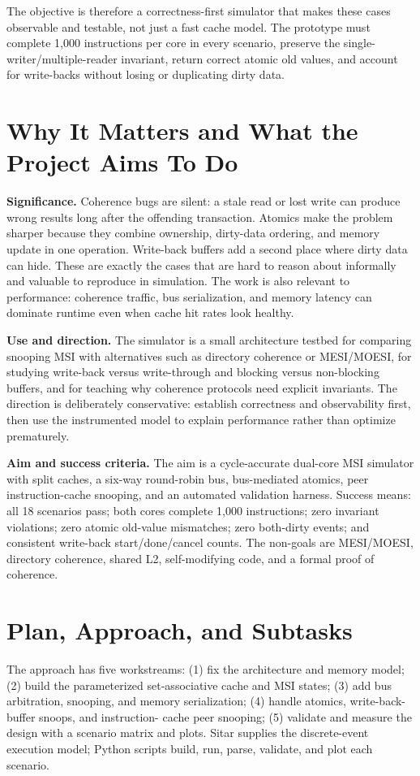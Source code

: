 \documentclass[11pt,a4paper]{article}
\begin{document}
The objective is therefore a correctness-first simulator that makes these cases
observable and testable, not just a fast cache model. The prototype must complete
1,000 instructions per core in every scenario, preserve the single-writer/multiple-reader
invariant, return correct atomic old values, and account for write-backs without losing
or duplicating dirty data.

\section{Why It Matters and What the Project Aims To Do}
\textbf{Significance.} Coherence bugs are silent: a stale read or lost write can produce
wrong results long after the offending transaction. Atomics make the problem sharper
because they combine ownership, dirty-data ordering, and memory update in one operation.
Write-back buffers add a second place where dirty data can hide. These are exactly the
cases that are hard to reason about informally and valuable to reproduce in simulation.
The work is also relevant to performance: coherence traffic, bus serialization, and
memory latency can dominate runtime even when cache hit rates look healthy.

\textbf{Use and direction.} The simulator is a small architecture testbed for comparing
snooping MSI with alternatives such as directory coherence or MESI/MOESI, for studying
write-back versus write-through and blocking versus non-blocking buffers, and for
teaching why coherence protocols need explicit invariants. The direction is deliberately
conservative: establish correctness and observability first, then use the instrumented
model to explain performance rather than optimize prematurely.

\textbf{Aim and success criteria.} The aim is a cycle-accurate dual-core MSI simulator
with split caches, a six-way round-robin bus, bus-mediated atomics, peer instruction-cache
snooping, and an automated validation harness. Success means: all 18 scenarios pass;
both cores complete 1,000 instructions; zero invariant violations; zero atomic old-value
mismatches; zero both-dirty events; and consistent write-back start/done/cancel counts.
The non-goals are MESI/MOESI, directory coherence, shared L2, self-modifying code, and a
formal proof of coherence.

\section{Plan, Approach, and Subtasks}
The approach has five workstreams: (1) fix the architecture and memory model; (2) build
the parameterized set-associative cache and MSI states; (3) add bus arbitration, snooping,
and memory serialization; (4) handle atomics, write-back-buffer snoops, and instruction-
cache peer snooping; (5) validate and measure the design with a scenario matrix and plots.
Sitar supplies the discrete-event execution model; Python scripts build, run, parse,
validate, and plot each scenario.
\end{document}
